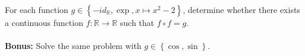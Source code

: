 \begin{problem}
    For each function \( g\in\left\{-id_{\mathbb{R}}, \exp, x\mapsto x^2-2\right\} \), determine whether there exists a continuous function \( f:\mathbb{R}\rightarrow\mathbb{R} \) such that \( f\circ f = g \).
    \\\\
    \textbf{Bonus:} Solve the same problem with \( g\in\left\{\cos,\sin\right\} \).
\end{problem}
